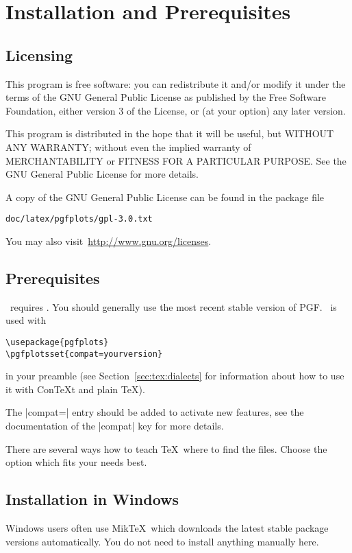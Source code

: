 
\section{Installation and Prerequisites}
\subsection{Licensing}
This program is free software: you can redistribute it and/or modify
it under the terms of the GNU General Public License as published by
the Free Software Foundation, either version 3 of the License, or
(at your option) any later version.

This program is distributed in the hope that it will be useful,
but WITHOUT ANY WARRANTY; without even the implied warranty of
MERCHANTABILITY or FITNESS FOR A PARTICULAR PURPOSE.  See the
GNU General Public License for more details.

A copy of the GNU General Public License can be found in the package file
\begin{verbatim}
doc/latex/pgfplots/gpl-3.0.txt
\end{verbatim}
You may also visit~\url{http://www.gnu.org/licenses}.

\subsection{Prerequisites}
\PGFPlots\ requires \PGF. You should generally use the most recent stable version of PGF. \PGFPlots\ is used with
\begin{verbatim}
\usepackage{pgfplots}
\pgfplotsset{compat=yourversion}
\end{verbatim}
in your preamble (see Section~\ref{sec:tex:dialects} for information about how to use it with Con{\TeX}t and plain \TeX).

The |compat=| entry should be added to activate new features, see the documentation of the |compat| key for more details.


There are several ways how to teach \TeX\ where to find the files. Choose the option which fits your needs best.

\subsection{Installation in Windows}
Windows users often use Mik\TeX\ which downloads the latest stable package versions automatically. You do not need to install anything manually here.

